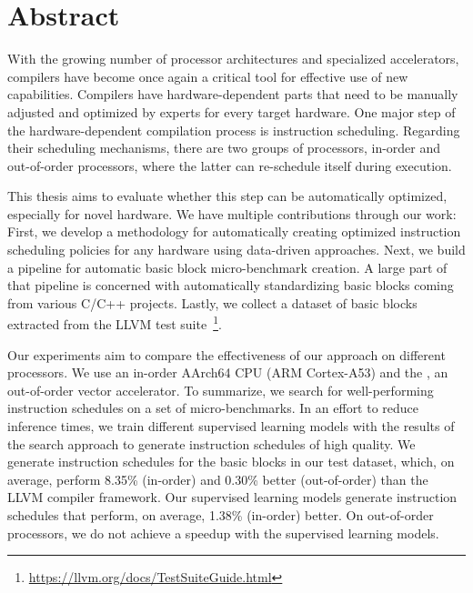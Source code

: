 \chapter*{Abstract}
With the growing number of processor architectures and specialized accelerators, compilers have become once again a critical tool for effective use of new capabilities.
Compilers have hardware-dependent parts that need to be manually adjusted and optimized by experts for every target hardware.
One major step of the hardware-dependent compilation process is instruction scheduling.
Regarding their scheduling mechanisms, there are two groups of processors, in-order and out-of-order processors, where the latter can re-schedule itself during execution.

This thesis aims to evaluate whether this step can be automatically optimized, especially for novel hardware.
We have multiple contributions through our work:
First, we develop a methodology for automatically creating optimized instruction scheduling policies for any hardware using data-driven approaches.
Next, we build a pipeline for automatic basic block micro-benchmark creation.
A large part of that pipeline is concerned with automatically standardizing basic blocks coming from various C/C++ projects.
Lastly, we collect a dataset of basic blocks extracted from the LLVM test suite~\footnote{\url{https://llvm.org/docs/TestSuiteGuide.html}}.

Our experiments aim to compare the effectiveness of our approach on different processors.
We use an in-order AArch64 CPU (ARM Cortex-A53) and the \aurora, an out-of-order vector accelerator.
To summarize, we search for well-performing instruction schedules on a set of micro-benchmarks.
In an effort to reduce inference times, we train different supervised learning models with the results of the search approach to generate instruction schedules of high quality.
We generate instruction schedules for the basic blocks in our test dataset, which, on average, perform 8.35\% (in-order) and 0.30\% better (out-of-order) than the LLVM compiler framework.
Our supervised learning models generate instruction schedules that perform, on average, 1.38\% (in-order) better.
On out-of-order processors, we do not achieve a speedup with the supervised learning models.

